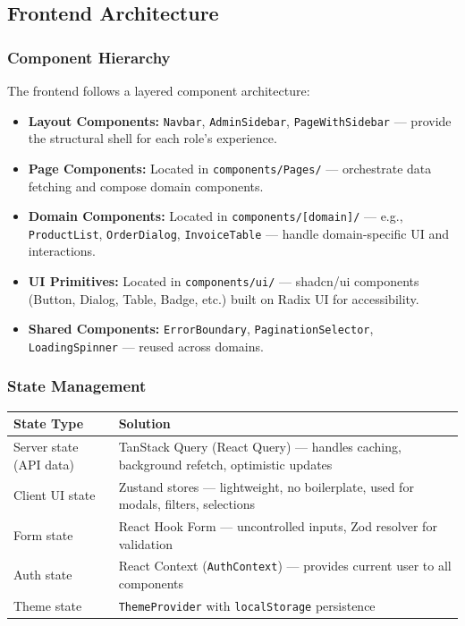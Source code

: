\documentclass[12pt,onecolumn]{IEEEtran}
\begin{document}
\subsection{Frontend Architecture}

\subsubsection{Component Hierarchy}

The frontend follows a layered component architecture:

\begin{itemize}[leftmargin=1.5em]
  \item \textbf{Layout Components:} \texttt{Navbar}, \texttt{AdminSidebar}, \texttt{PageWithSidebar} --- provide the structural shell for each role's experience.
  \item \textbf{Page Components:} Located in \texttt{components/Pages/} --- orchestrate data fetching and compose domain components.
  \item \textbf{Domain Components:} Located in \texttt{components/[domain]/} --- e.g., \texttt{ProductList}, \texttt{OrderDialog}, \texttt{InvoiceTable} --- handle domain-specific UI and interactions.
  \item \textbf{UI Primitives:} Located in \texttt{components/ui/} --- shadcn/ui components (Button, Dialog, Table, Badge, etc.) built on Radix UI for accessibility.
  \item \textbf{Shared Components:} \texttt{ErrorBoundary}, \texttt{PaginationSelector}, \texttt{LoadingSpinner} --- reused across domains.
\end{itemize}

\subsubsection{State Management}

\begin{center}
\begin{tabularx}{\textwidth}{lX}
  \toprule
  \textbf{State Type} & \textbf{Solution} \\
  \midrule
  Server state (API data) & TanStack Query (React Query) --- handles caching, background refetch, optimistic updates \\
  Client UI state         & Zustand stores --- lightweight, no boilerplate, used for modals, filters, selections \\
  Form state              & React Hook Form --- uncontrolled inputs, Zod resolver for validation \\
  Auth state              & React Context (\texttt{AuthContext}) --- provides current user to all components \\
  Theme state             & \texttt{ThemeProvider} with \texttt{localStorage} persistence \\
  \bottomrule
\end{tabularx}
\end{center}
\end{document}
